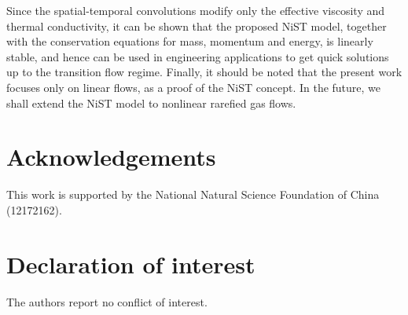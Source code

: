 \documentclass[lineno]{jfm}
\begin{document}
Since the spatial-temporal convolutions modify only the effective viscosity and thermal conductivity, it can be shown that the proposed NiST model, together with the conservation equations for mass, momentum and energy, is linearly stable, and hence can be used in engineering applications to get quick solutions up to the transition flow regime. Finally, it should be noted that the present work focuses only on linear flows, as a proof of the NiST concept. In the future, we shall extend the NiST model to nonlinear rarefied gas flows. 




 
\section{Acknowledgements}\label{sec:Acknowledgements}
	
This work is supported by the National Natural Science Foundation of China (12172162). 
	
\section{Declaration of interest}\label{sec:intrest}
	
The authors report no conflict of interest.



	
\end{document}
